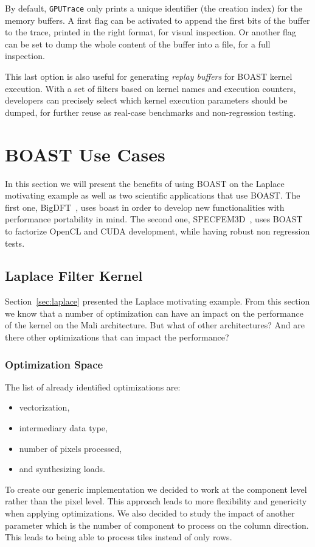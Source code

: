 \documentclass[11pt, a4paper, twoside]{montblanc}
\newcommand{\code}[1]{\texttt{#1}}
\begin{document}
By default, \code{GPUTrace} only prints a unique identifier (the
creation index) for the memory buffers. A first flag can be activated
to append the first bits of the buffer to the trace, printed in the
right format, for visual inspection. Or another flag can be set to
dump the whole content of the buffer into a file, for a full
inspection.

This last option is also useful for generating \emph{replay buffers}
for BOAST kernel execution. With a set of filters based on kernel
names and execution counters, developers can precisely select which
kernel execution parameters should be dumped, for further reuse as
real-case benchmarks and non-regression testing.

\section{BOAST Use Cases}
\label{use_cases}

In this section we will present the benefits of using BOAST on the Laplace
motivating example as well as two scientific applications that use BOAST. The
first one, BigDFT~\cite{genovese2008daubechies}, uses boast in order to develop new
functionalities with performance portability in mind. The second one,
SPECFEM3D~\cite{komatitsch2011fluid}, uses BOAST to factorize OpenCL and CUDA
development, while having robust non regression tests.

  \subsection{Laplace Filter Kernel}

Section~\ref{sec:laplace} presented the Laplace motivating example. From this
section we know that a number of optimization can have an impact on the
performance of the kernel on the Mali architecture. But what of other
architectures? And are there other optimizations that can impact the
performance?

    \subsubsection{Optimization Space}

The list of already identified optimizations are:
\begin{itemize}
\item vectorization,
\item intermediary data type,
\item number of pixels processed,
\item and synthesizing loads.
\end{itemize}
To create our generic implementation we decided to work at the component level
rather than the pixel level. This approach leads to more flexibility and
genericity when applying optimizations. We also decided to study the impact of
another parameter which is the number of component to process on the column
direction. This leads to being able to process tiles instead of only rows.
\end{document}
